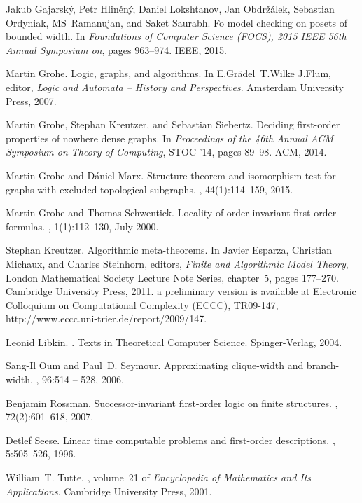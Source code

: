 \documentclass[12pt]{amsart}
\begin{document}
\begin{thebibliography}{10}
Jakub Gajarský, Petr Hliněný, Daniel Lokshtanov, Jan Obdržálek, Sebastian
  Ordyniak, MS~Ramanujan, and Saket Saurabh.
\newblock Fo model checking on posets of bounded width.
\newblock In {\em Foundations of Computer Science (FOCS), 2015 IEEE 56th Annual
  Symposium on}, pages 963--974. IEEE, 2015.

Martin Grohe.
\newblock Logic, graphs, and algorithms.
\newblock In E.Gr{\"a}del~T.Wilke J.Flum, editor, {\em Logic and Automata --
  History and Perspectives}. Amsterdam University Press, 2007.

Martin Grohe, Stephan Kreutzer, and Sebastian Siebertz.
\newblock Deciding first-order properties of nowhere dense graphs.
\newblock In {\em Proceedings of the 46th Annual ACM Symposium on Theory of
  Computing}, STOC '14, pages 89--98. ACM, 2014.

Martin Grohe and Dániel Marx.
\newblock Structure theorem and isomorphism test for graphs with excluded
  topological subgraphs.
, 44(1):114--159, 2015.

Martin Grohe and Thomas Schwentick.
\newblock Locality of order-invariant first-order formulas.
, 1(1):112--130, July 2000.

Stephan Kreutzer.
\newblock Algorithmic meta-theorems.
\newblock In Javier Esparza, Christian Michaux, and Charles Steinhorn, editors,
  {\em Finite and Algorithmic Model Theory}, London Mathematical Society
  Lecture Note Series, chapter~5, pages 177--270. Cambridge University Press,
  2011.
\newblock a preliminary version is available at Electronic Colloquium on
  Computational Complexity (ECCC), TR09-147,
  http://www.eccc.uni-trier.de/report/2009/147.

Leonid Libkin.
.
\newblock Texts in Theoretical Computer Science. Spinger-Verlag, 2004.

Sang-Il Oum and Paul~D. Seymour.
\newblock Approximating clique-width and branch-width.
, 96:514 -- 528, 2006.

Benjamin Rossman.
\newblock Successor-invariant first-order logic on finite structures.
, 72(2):601--618, 2007.

Detlef Seese.
\newblock Linear time computable problems and first-order descriptions.
, 5:505--526,
  1996.

William~T. Tutte.
, volume~21 of {\em Encyclopedia of Mathematics and
  Its Applications}.
\newblock Cambridge University Press, 2001.

\end{thebibliography}
\end{document}
